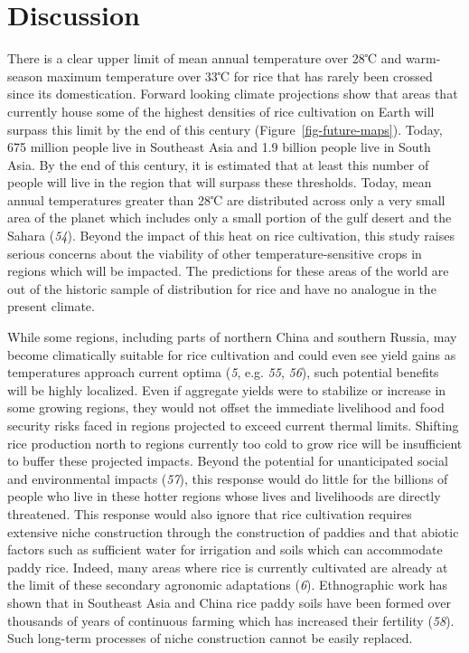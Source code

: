 \documentclass[
  letterpaper,
  DIV=11,
  numbers=noendperiod]{scrartcl}
\begin{document}
\section{Discussion}\label{discussion}

There is a clear upper limit of mean annual temperature over 28℃ and
warm-season maximum temperature over 33℃ for rice that has rarely been
crossed since its domestication. Forward looking climate projections
show that areas that currently house some of the highest densities of
rice cultivation on Earth will surpass this limit by the end of this
century (Figure~\ref{fig-future-maps}). Today, 675 million people live
in Southeast Asia and 1.9 billion people live in South Asia. By the end
of this century, it is estimated that at least this number of people
will live in the region that will surpass these thresholds. Today, mean
annual temperatures greater than 28℃ are distributed across only a very
small area of the planet which includes only a small portion of the gulf
desert and the Sahara (\emph{54}). Beyond the impact of this heat on
rice cultivation, this study raises serious concerns about the viability
of other temperature-sensitive crops in regions which will be impacted.
The predictions for these areas of the world are out of the historic
sample of distribution for rice and have no analogue in the present
climate.

While some regions, including parts of northern China and southern
Russia, may become climatically suitable for rice cultivation and could
even see yield gains as temperatures approach current optima (\emph{5},
e.g. \emph{55}, \emph{56}), such potential benefits will be highly
localized. Even if aggregate yields were to stabilize or increase in
some growing regions, they would not offset the immediate livelihood and
food security risks faced in regions projected to exceed current thermal
limits. Shifting rice production north to regions currently too cold to
grow rice will be insufficient to buffer these projected impacts. Beyond
the potential for unanticipated social and environmental impacts
(\emph{57}), this response would do little for the billions of people
who live in these hotter regions whose lives and livelihoods are
directly threatened. This response would also ignore that rice
cultivation requires extensive niche construction through the
construction of paddies and that abiotic factors such as sufficient
water for irrigation and soils which can accommodate paddy rice. Indeed,
many areas where rice is currently cultivated are already at the limit
of these secondary agronomic adaptations (\emph{6}). Ethnographic work
has shown that in Southeast Asia and China rice paddy soils have been
formed over thousands of years of continuous farming which has increased
their fertility (\emph{58}). Such long-term processes of niche
construction cannot be easily replaced.
\end{document}
